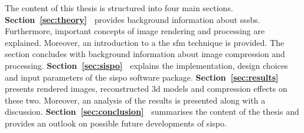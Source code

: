 The content of this thesis is structured into four main sections. \newline
\textbf{Section~\ref{sec:theory}~} provides background information about \glspl{sssb}. Furthermore, important concepts of image rendering and processing are explained. Moreover, an introduction to a the \gls{sfm} technique is provided. The section concludes with background information about image compression and processing. \newline
\textbf{Section~\ref{sec:sispo}~} explains the implementation, design choices and input parameters of the \gls{sispo} software package. \newline
\textbf{Section~\ref{sec:results}~} presents rendered images, reconstructed \gls{3d} models and compression effects on these two. Moreover, an analysis of the results is presented along with a discussion. \newline
\textbf{Section~\ref{sec:conclusion}~} summarises the content of the thesis and provides an outlook on possible future developments of \gls{sispo}.


